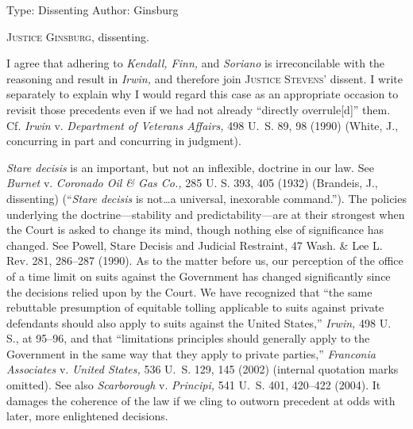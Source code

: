 Type: Dissenting
Author: Ginsburg

\setcounter{page}{144}

  \textsc{Justice Ginsburg,} dissenting.

  I agree that adhering to \emph{Kendall, Finn,} and \emph{Soriano} is irreconcilable with the reasoning and result in \emph{Irwin,} and therefore join \textsc{Justice Stevens}' dissent. I write separately to explain why I would regard this case as an appropriate occasion to revisit those precedents even if we had not already ``directly overrule[d]'' them. Cf. \emph{Irwin} v. \emph{Department of Veterans Affairs,} 498 U.~S. 89, 98 (1990) (White, J., concurring in part and concurring in judgment).

  \emph{Stare decisis} is an important, but not an inflexible, doctrine in our law. See \emph{Burnet} v. \emph{Coronado Oil \& Gas Co.,} 285 U. S. 393, 405 (1932) (Brandeis, J., dissenting) (``\emph{Stare decisis} is not\dots a universal, inexorable command.''). The policies underlying the doctrine---stability and predictability---are at their strongest when the Court is asked to change its mind, though nothing else of significance has changed. See Powell, Stare Decisis and Judicial Restraint, 47 Wash. \& Lee L. Rev. 281, 286--287 (1990). As to the matter before us, our perception of the office of a time limit on suits against the Government has changed significantly since the decisions relied upon by the Court. We have recognized that ``the same rebuttable presumption of equitable tolling applicable to suits against private defendants should also apply to suits against the United States,'' \emph{Irwin,} 498 U. S., at 95--96, and that ``limitations principles should generally apply to the Government in the same way that they apply to private parties,'' \emph{Franconia Associates} v. \emph{United States,} 536 U.~S. 129, 145 (2002) (internal quotation marks omitted). See also \emph{Scarborough} v. \emph{Principi,} 541 U.~S. 401, 420--422 (2004). It damages the coherence of the law if we cling to outworn precedent at odds with later, more enlightened decisions.

